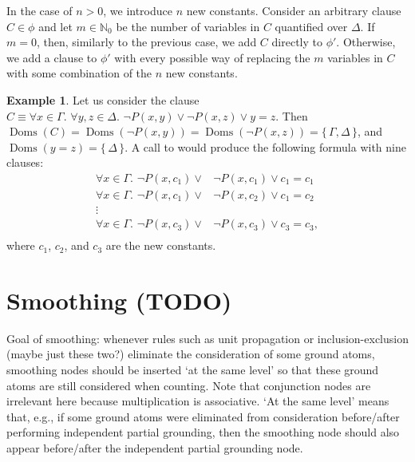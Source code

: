 \documentclass{article}
\theoremstyle{definition}
\newtheorem{example}{Example}
\DeclareMathOperator{\Doms}{Doms}
\begin{document}
In the case of $n>0$, we introduce $n$ new constants. Consider an arbitrary
clause $C \in \phi$ and let $m \in \mathbb{N}_{0}$ be the number of variables in
$C$ quantified over $\Delta$. If $m=0$, then, similarly to the previous case, we
add $C$ directly to $\phi'$. Otherwise, we add a clause to $\phi'$ with every
possible way of replacing the $m$ variables in $C$ with some combination of the
$n$ new constants.

\begin{example}
  Let us consider the clause $C \equiv \forall x \in \Gamma\text{.
  }\forall y, z \in \Delta\text{. } \neg P(x, y) \lor \neg P(x, z) \lor y=z$.
  Then
  $\Doms(C) = \Doms(\neg P(x, y)) = \Doms(\neg P(x, z)) = \{\, \Gamma, \Delta \,\}$,
  and $\Doms(y=z) = \{\, \Delta \,\}$. A call to  would produce the following formula with nine clauses:
  \begin{align*}
    \forall x \in \Gamma\text{. }\neg P(x, c_{1}) \lor& \neg P(x, c_{1}) \lor c_{1}=c_{1}\\
    \forall x \in \Gamma\text{. }\neg P(x, c_{1}) \lor& \neg P(x, c_{2}) \lor c_{1}=c_{2}\\
    \vdots&\\
    \forall x \in \Gamma\text{. }\neg P(x, c_{3}) \lor& \neg P(x, c_{3}) \lor c_{3}=c_{3},\\
  \end{align*}
  where $c_{1}$, $c_{2}$, and $c_{3}$ are the new constants.
\end{example}

\section{Smoothing (TODO)}

Goal of smoothing: whenever rules such as unit propagation or
inclusion-exclusion (maybe just these two?) eliminate the consideration of some
ground atoms, smoothing nodes should be inserted `at the same level' so that
these ground atoms are still considered when counting. Note that conjunction
nodes are irrelevant here because multiplication is associative. `At the same
level' means that, e.g., if some ground atoms were eliminated from consideration
before/after performing independent partial grounding, then the smoothing node
should also appear before/after the independent partial grounding node.

\end{document}
